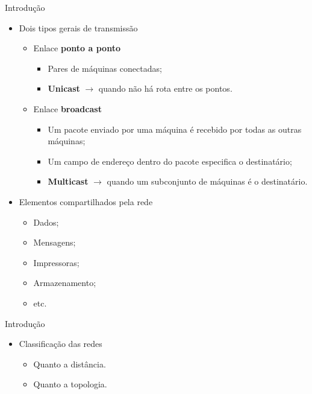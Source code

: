 \documentclass{libs/ufc_format}
\begin{document}
\begin{frame}{Introdução}
    \begin{itemize}
        \justifying
        \item Dois tipos gerais de transmissão
            \begin{itemize}
                \justifying
                \item<2-7> Enlace \textbf{ponto a ponto}
                    \begin{itemize}
                        \justifying
                        \item<3-7> Pares de máquinas conectadas;
                        \item<4-7> \textbf{Unicast} $\rightarrow$ quando não há rota entre os pontos.
                    \end{itemize}
                \item<2-7> Enlace \textbf{broadcast}
                    \begin{itemize}
                        \justifying
                        \item<5-7> Um pacote enviado por uma máquina é recebido por todas as outras máquinas;
                        \item<6-7> Um campo de endereço dentro do pacote especifica o destinatário;
                        \item<7> \textbf{Multicast} $\rightarrow$ quando um subconjunto de máquinas é o destinatário.
                    \end{itemize}
            \end{itemize}
            \item<8-> Elementos compartilhados pela rede
                \begin{itemize}
                    \item<9-> Dados;
                    \item<10-> Mensagens;
                    \item<11-> Impressoras;
                    \item<12-> Armazenamento;
                    \item<12-> etc.
                \end{itemize}
    \end{itemize}
\end{frame}

\begin{frame}{Introdução}
    \begin{itemize}
        \item Classificação das redes
            \begin{itemize}
                \item<2-> \alert<3>{Quanto a distância}.
                \item<2-> Quanto a topologia.
            \end{itemize}
    \end{itemize}
\end{frame}
\end{document}
